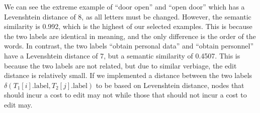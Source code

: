 We can see the extreme example of ``door open'' and ``open door'' which has a Levenshtein distance of 8, as all letters must be changed. However, the semantic similarity is 0.992, which is the highest of our selected examples. This is because the two labels are identical in meaning, and the only difference is the order of the words. In contrast, the two labels ``obtain personal data'' and ``obtain personnel'' have a Levenshtein distance of 7, but a semantic similarity of 0.4507. This is because the two labels are not related, but due to similar verbiage, the edit distance is relatively small. If we implemented a distance between the two labels  $\delta\left(T_1[i].\text{label}, T_2[j].\text{label}\right)$ to be based on Levenshtein distance, nodes that should incur a cost to edit may not while those that should not incur a cost to edit may.

